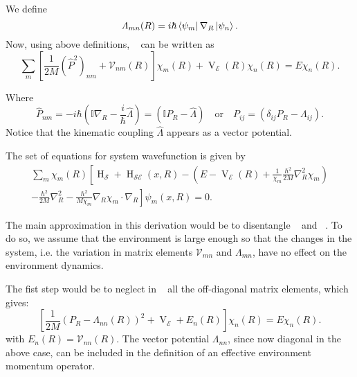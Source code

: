 We define
\begin{equation}
    \Lambda_{mn}(R) = i\hbar \bra{\psi_m}\nabla_R\ket{\psi_n}.
\end{equation}
Now, using above definitions, ~ can be written as
\begin{equation}
    \label{eqn:chap2_clc_evol}
    \sum_m \left[ \frac{1}{2M} ({\hat{P}}^2)_{nm} +  
    \mathcal{V}_{nm}(R)\right] \chi_m(R) + \operatorname{V}_{\mathcal{E}}(R) \chi_n(R) 
    = E \chi_n(R).
\end{equation}

Where
\begin{equation}
    {\hat{P}}_{nm} = -i\hbar \left(\mathbb{I}\nabla_R - \frac{i}{\hbar}
    \hat{\Lambda} \right) =
 \left(\mathbb{I}P_R - \hat{\Lambda}\right) \quad \text{or} \quad P_{ij} = 
 \left(\delta_{ij}P_R - {\Lambda}_{ij}\right).
\end{equation}
Notice that the kinematic coupling
$\hat{\Lambda}$ appears as a vector potential. 

The set of equations for system wavefunction is given by
\begin{multline}
    \label{eqn:chap2_system_evol}
    \sum_{m} \chi_m(R) \left[
    \operatorname{H}_{\mathcal{S}} + \operatorname{H}_{\mathcal{SE}}(x, R)  - \left(
        E - \operatorname{V}_{\mathcal{E}}(R) + 
        \frac{1}{\chi_m} \frac{\hbar^2}{2M} \nabla_R^2 \chi_m
    \right) \right. \\\left. - \frac{\hbar^2}{2M} \nabla_R^2 - 
    \frac{\hbar^2}{M\chi_m} \nabla_R \chi_m \cdot \nabla_R \right] \psi_m(x, R) = 0.
\end{multline}

The main approximation in this derivation would be to disentangle 
~ and ~. To do so, 
we assume that the environment is large enough so that the changes in the system,
i.e. the variation in matrix elements $\mathcal{V}_{mn}$ and $\Lambda_{mn}$, have
no effect on the environment dynamics. 

The fist step would be to neglect in ~  all the off-diagonal
matrix elements, which gives:
\begin{equation}
\label{eq:chap2_no_off_diag}
    \left[ \frac{1}{2M} \left(P_R -  
    \Lambda_{nn}(R)\right)^2 + \operatorname{V}_{\mathcal{E}} + E_n(R) \right] \chi_n(R) = E \chi_n(R).
\end{equation}
with \(E_n(R) = \mathcal{V}_{nn}(R) \). The vector potential \(\Lambda_{nn}\), since now diagonal in the above case, can be included in the
definition of an effective environment momentum operator. 


